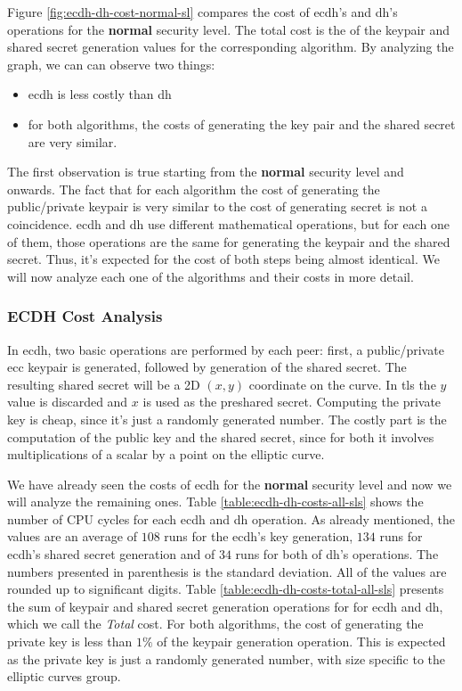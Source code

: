 \documentclass{llncs}
\begin{document}
Figure \ref{fig:ecdh-dh-cost-normal-sl} compares the cost of \gls{ecdh}'s and \gls{dh}'s operations for the \textbf{normal} security level.
The total cost is the of the keypair and shared secret generation values for the corresponding algorithm. By analyzing the graph, we can can
observe two things:

\begin{itemize}
  \item \gls{ecdh} is less costly than \gls{dh}
  \item for both algorithms, the costs of generating the key pair and the shared secret are very similar.
\end{itemize}

The first observation is true starting from the \textbf{normal} security level and onwards.
The fact that for each algorithm the cost of generating the public/private keypair is very similar to the cost of generating secret is not a coincidence.
\gls{ecdh} and \gls{dh} use different mathematical operations, but for each one of them, those operations are the same for generating the keypair
and the shared secret. Thus, it's expected for the cost of both steps being almost identical. We will now analyze each one of the algorithms and
their costs in more detail.

\subsubsection{ECDH Cost Analysis}

In \gls{ecdh}, two basic operations are performed by each peer: first, a public/private \gls{ecc} keypair is generated, followed by generation of
the shared secret. The resulting shared secret will be a 2D $(x,y)$ coordinate on the curve. In \gls{tls} the $y$ value is discarded and $x$ is
used as the preshared secret. Computing the private key is cheap, since it's just a randomly generated number. The costly part is the computation of
the public key and the shared secret, since for both it involves multiplications of a scalar by a point on the elliptic curve.

We have already seen the costs of \gls{ecdh} for the \textbf{normal} security level and now we will analyze the remaining ones. Table
\ref{table:ecdh-dh-costs-all-sls} shows the number of CPU cycles for each \gls{ecdh} and \gls{dh} operation. As already mentioned, the values are
an average of $108$ runs for the \gls{ecdh}'s key generation, $134$ runs for \gls{ecdh}'s shared secret generation and of $34$ runs for both of \gls{dh}'s
operations. The numbers presented in parenthesis is the standard deviation. All of the values are rounded up to significant digits.
Table \ref{table:ecdh-dh-costs-total-all-sls} presents the sum of keypair and shared secret generation operations for for \gls{ecdh} and \gls{dh},
which we call the \textit{Total} cost. For both algorithms, the cost of generating the private key is less than $1\%$ of the keypair generation operation.
This is expected as the private key is just a randomly generated number, with size specific to the elliptic curves group.
\end{document}
